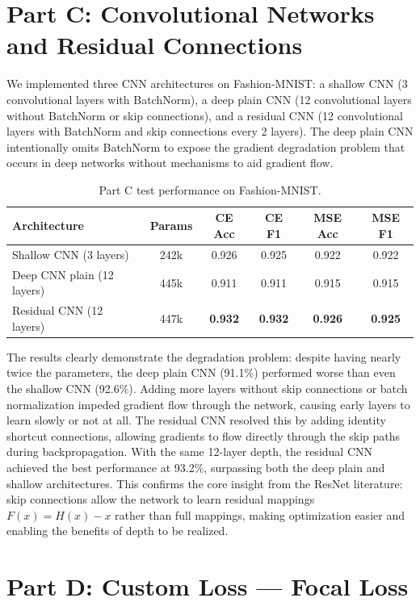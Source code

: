 \documentclass[11pt,a4paper]{article}
\begin{document}
\section{Part C: Convolutional Networks and Residual Connections}

We implemented three CNN architectures on Fashion-MNIST: a shallow CNN (3 convolutional layers with BatchNorm), a deep plain CNN (12 convolutional layers without BatchNorm or skip connections), and a residual CNN (12 convolutional layers with BatchNorm and skip connections every 2 layers). The deep plain CNN intentionally omits BatchNorm to expose the gradient degradation problem that occurs in deep networks without mechanisms to aid gradient flow.

\begin{table}[H]
\centering
\begin{tabular}{lccccc}
\toprule
Architecture & Params & CE Acc & CE F1 & MSE Acc & MSE F1 \\
\midrule
Shallow CNN (3 layers) & 242k & 0.926 & 0.925 & 0.922 & 0.922 \\
Deep CNN plain (12 layers) & 445k & 0.911 & 0.911 & 0.915 & 0.915 \\
Residual CNN (12 layers) & 447k & \textbf{0.932} & \textbf{0.932} & \textbf{0.926} & \textbf{0.925} \\
\bottomrule
\end{tabular}
\caption{Part C test performance on Fashion-MNIST.}
\end{table}

The results clearly demonstrate the degradation problem: despite having nearly twice the parameters, the deep plain CNN (91.1\%) performed worse than even the shallow CNN (92.6\%). Adding more layers without skip connections or batch normalization impeded gradient flow through the network, causing early layers to learn slowly or not at all. The residual CNN resolved this by adding identity shortcut connections, allowing gradients to flow directly through the skip paths during backpropagation. With the same 12-layer depth, the residual CNN achieved the best performance at 93.2\%, surpassing both the deep plain and shallow architectures. This confirms the core insight from the ResNet literature: skip connections allow the network to learn residual mappings $F(x) = H(x) - x$ rather than full mappings, making optimization easier and enabling the benefits of depth to be realized.

\section{Part D: Custom Loss --- Focal Loss}
\end{document}
